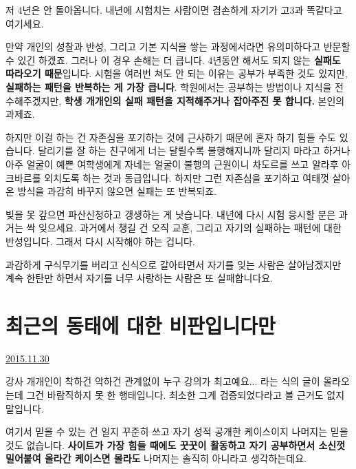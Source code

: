 저 4년은 안 돌아옵니다.
내년에 시험치는 사람이면 겸손하게 자기가 고3과 똑같다고 여기세요.
\vspace{5mm}

만약 개인의 성찰과 반성, 그리고 기본 지식을 쌓는 과정에서라면 유의미하다고 반문할 수 있긴 하겠죠.
그러나 이 경우 손해는 더 큽니다. 4년동안 해서도 되지 않는 \textbf{실패도 따라오기 때문}입니다.
시험을 여러번 쳐도 안 되는 이유는 공부가 부족한 것도 있지만, \textbf{실패하는 패턴을 반복하는 게 가장 큽니다}.
학원에서는 공부하는 방법이나 지식을 전수해주겠지만, \textbf{학생 개개인의 실패 패턴을 지적해주거나 잡아주진 못 합니다.}
본인의 과제죠.
\vspace{5mm}

하지만 이걸 하는 건 자존심을 포기하는 것에 근사하기 때문에 혼자 하기 힘들 수도 있습니다.
달리기를 잘 하는 친구에게 너는 달릴수록 불행해지니까 달리지 마라고 하거나
아주 얼굴이 예쁜 여학생에게 자네는 얼굴이 불행의 근원이니 차도르를 쓰고 알라후 아크바르를 외치도록 하는 것과 동급입니다.
하지만 그런 자존심을 포기하고 여태껏 살아온 방식을 과감히 바꾸지 않으면 실패는 또 반복되죠.
\vspace{5mm}

빚을 못 갚으면 파산신청하고 갱생하는 게 낫습니다.
내년에 다시 시험 응시할 분은 과거는 싹 잊으세요. 과거에서 챙길 건 오직 교훈, 그리고 자기의 실패하는 패턴에 대한 반성입니다.
그래서 다시 시작해야 하는 겁니다.
\vspace{5mm}

과감하게 구식무기를 버리고 신식으로 갈아타면서 자기를 잊는 사람은 살아남겠지만
계속 한탄만 하면서 자기를 너무 사랑하는 사람은 또 실패합니다요.
\vspace{5mm}




\section{최근의 동태에 대한 비판입니다만}
\href{https://www.kockoc.com/Apoc/518822}{2015.11.30}

\vspace{5mm}

강사 개개인이 착하건 악하건 관계없이
누구 강의가 최고예요... 라는 식의 글이 올라오는데 그건 바람직하지 못 한 행태입니다.
최소한 그게 검증되었다라고 볼 근거도 없지 말입니다.
\vspace{5mm}

여기서 믿을 수 있는 건 일지 꾸준히 쓰고 자기 성적 공개한 케이스이지
나머지는 믿을 것도 없습니다.
\textbf{사이트가 가장 힘들 때에도 꿋꿋이 활동하고 자기 공부하면서 소신껏 밀어붙여 올라간 케이스면 몰라도}
나머지는 솔직히 아니라고 생각하는데요.
\vspace{5mm}


